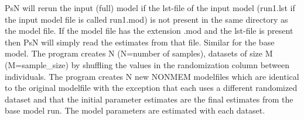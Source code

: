 PsN will rerun the input (full) model if the lst-file of the input model (run1.lst if the input model file is called run1.mod) is not present in the same directory as the model file. 
If the model file has the extension .mod and the lst-file is present then PsN will simply read the estimates from that file. Similar for the base model.
The program creates N (N=number of samples), datasets of size M (M=sample\_size) by shuffling the values in the randomization column between individuals. The program creates N new NONMEM modelfiles which are identical to the original modelfile with the exception that each uses a different randomized dataset and that the initial parameter estimates are the final estimates from the base model run. The model parameters are estimated with each dataset.



